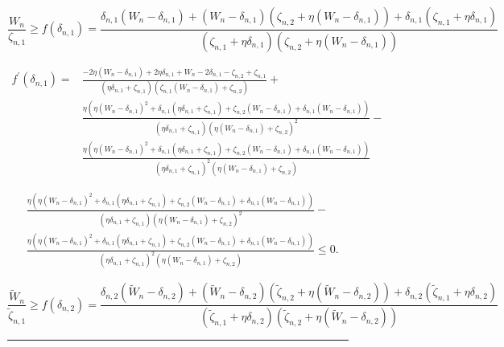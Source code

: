 \documentclass[a4paper,journal,10pt]{IEEEtran}
\newcounter{tempEqCounter}
\begin{document}
\setcounter{tempEqCounter}{\value{equation}}
\setcounter{equation}{10}
\begin{figure}[tbp]
\begin{equation}\label{10}
    \frac{W_n}{\zeta_{n,1}}\ge f(\delta_{n,1})=\frac{\delta_{n,1}(W_n-\delta_{n,1})+(W_n-\delta_{n,1})(\zeta_{n,2}+\eta(W_n-\delta_{n,1}))+\delta_{n,1}(\zeta_{n,1}+\eta\delta_{n,1})}{(\zeta_{n,1}+\eta\delta_{n,1})(\zeta_{n,2}+\eta(W_n-\delta_{n,1}))}
\end{equation}
\end{figure}
\setcounter{equation}{11}
\begin{figure}[tbp]
\begin{equation}\label{18}
\begin{split}
	f^{\prime}(\delta_{n,1})= & \frac{-2\eta (W_n-\delta_{n,1})+2\eta \delta_{n,1}+W_n-2\delta_{n,1} -\zeta_{n,2}+\zeta_{n,1}}{(\eta\delta_{n,1}+\zeta_{n,1})(\zeta_{n,1}(W_n-\delta_{n,1})+\zeta_{n,2})} +\\
	 &\frac{\eta\left(\eta(W_n-\delta_{n,1})^2+\delta_{n,1}(\eta \delta_{n,1}+\zeta_{n,1})+\zeta_{n,2}(W_n-\delta_{n,1})+\delta_{n,1}(W_n-\delta_{n,1})\right)}{(\eta \delta_{n,1}+\zeta_{n,1})(\eta(W_n-\delta_{n,1})+\zeta_{n,2})^2}-\\
	 &\frac{\eta\left(\eta(W_n-\delta_{n,1})^2+\delta_{n,1}(\eta \delta_{n,1}+\zeta_{n,1})+\zeta_{n,2}(W_n-\delta_{n,1})+\delta_{n,1}(W_n-\delta_{n,1})\right)}{(\eta \delta_{n,1}+\zeta_{n,1})^2(\eta(W_n-\delta_{n,1})+\zeta_{n,2})}
\end{split}
\end{equation}
\end{figure} 

\begin{figure}[tbp]
\begin{equation}\label{leq}
\begin{split}
	 &\frac{\eta\left(\eta(W_n-\delta_{n,1})^2+\delta_{n,1}(\eta \delta_{n,1}+\zeta_{n,1})+\zeta_{n,2}(W_n-\delta_{n,1})+\delta_{n,1}(W_n-\delta_{n,1})\right)}{(\eta \delta_{n,1}+\zeta_{n,1})(\eta(W_n-\delta_{n,1})+\zeta_{n,2})^2}-\\
	 &\frac{\eta\left(\eta(W_n-\delta_{n,1})^2+\delta_{n,1}(\eta \delta_{n,1}+\zeta_{n,1})+\zeta_{n,2}(W_n-\delta_{n,1})+\delta_{n,1}(W_n-\delta_{n,1})\right)}{(\eta \delta_{n,1}+\zeta_{n,1})^2(\eta(W_n-\delta_{n,1})+\zeta_{n,2})} \leq 0.
\end{split}
\end{equation}
\end{figure}
\setcounter{equation}{15}
\begin{figure}[tbp]
\begin{equation}\label{21}
    \frac{\widetilde{W}_n}{\widetilde{\zeta}_{n,1}}\ge f(\delta_{n,2})=\frac{\delta_{n,2}(\widetilde{W}_n-\delta_{n,2})+(\widetilde{W}_n-\delta_{n,2})(\widetilde{\zeta}_{n,2}+\eta(\widetilde{W}_n -\delta_{n,2}))+\delta_{n,2}(\widetilde{\zeta}_{n,1}+\eta\delta_{n,2})}{(\widetilde{\zeta}_{n,1}+\eta\delta_{n,2})(\widetilde{\zeta}_{n,2}+\eta(\widetilde{W}_n-\delta_{n,2}))}
\end{equation}
{\noindent} \rule[-10pt]{18cm}{0.05em}
\end{figure}
\end{document}
